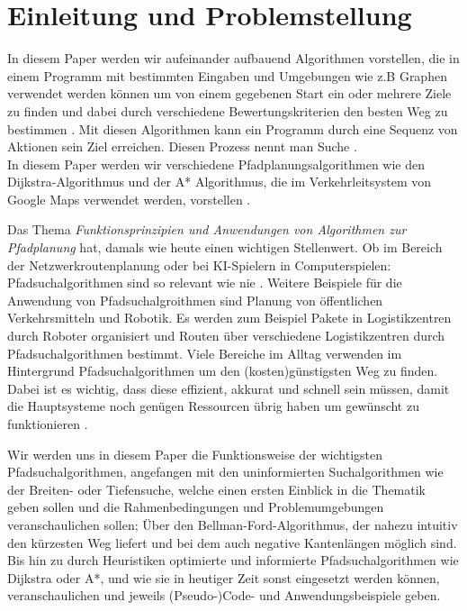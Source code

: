 
\chapter{Einleitung und Problemstellung}
\label{Einleitung und Problemstellung}


In diesem Paper werden wir aufeinander aufbauend Algorithmen vorstellen, die in einem Programm mit bestimmten Eingaben und Umgebungen 
wie z.B Graphen verwendet werden können um von einem gegebenen Start ein oder mehrere Ziele zu finden und dabei durch verschiedene Bewertungskriterien den besten Weg zu bestimmen \cite{Esri:00}.
Mit diesen Algorithmen kann ein Programm durch eine Sequenz von Aktionen sein Ziel erreichen. Diesen Prozess nennt man Suche \cite[150-156]{Russell:10}. \\


In diesem Paper werden wir verschiedene Pfadplanungsalgorithmen wie den Dijkstra-Algorithmus und der A* Algorithmus, 
die im Verkehrleitsystem von Google Maps verwendet werden, vorstellen \cite{Mehta:19}. 

Das Thema \emph{Funktionsprinzipien und Anwendungen von Algorithmen zur Pfadplanung} hat, damals wie heute einen wichtigen Stellenwert. 
Ob im Bereich der Netzwerkroutenplanung oder bei KI-Spielern in Computerspielen: Pfadsuchalgorithmen sind so relevant wie nie \cite{Foeada:21}. 
Weitere Beispiele für die Anwendung von Pfadsuchalgroithmen sind Planung von öffentlichen Verkehrsmitteln und 
Robotik. Es werden zum Beispiel Pakete in Logistikzentren durch Roboter organisiert und Routen über verschiedene Logistikzentren durch Pfadsuchalgorithmen bestimmt.
Viele Bereiche im Alltag verwenden im Hintergrund Pfadsuchalgorithmen um den (kosten)günstigsten Weg zu finden. Dabei ist es wichtig, 
dass diese effizient, akkurat und schnell sein müssen, damit die Hauptsysteme noch genügen Ressourcen übrig haben um gewünscht zu funktionieren \cite{Foeada:21}. 

Wir werden uns in diesem Paper die Funktionsweise der wichtigsten Pfadsuchalgorithmen, angefangen mit den uninformierten Suchalgorithmen wie der Breiten- oder Tiefensuche, 
welche einen ersten Einblick in die Thematik geben sollen und die Rahmenbedingungen und Problemumgebungen veranschaulichen sollen; 
Über den Bellman-Ford-Algorithmus, der nahezu intuitiv den kürzesten Weg liefert und bei dem auch negative Kantenlängen möglich sind\cite{Mukhlif:20}. 
Bis hin zu durch Heuristiken optimierte und informierte Pfadsuchalgorithmen wie Dijkstra oder A*, und wie sie in heutiger Zeit 
sonst eingesetzt werden können, veranschaulichen und jeweils (Pseudo-)Code- und Anwendungsbeispiele geben\cite[64]{Russell:10}.
